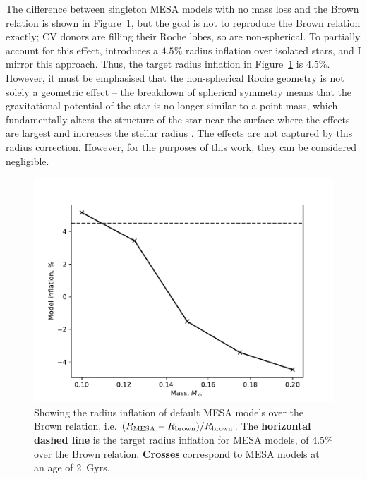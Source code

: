 The difference between singleton MESA models with no mass loss and the Brown relation is shown in Figure~\ref{fig:modelling:MESA inflation over Brown relation}, but the goal is not to reproduce the Brown relation exactly; CV donors are filling their Roche lobes, so are non-spherical.
To partially account for this effect, \citet{knigge11} introduces a $4.5\%$ radius inflation over isolated stars, and I mirror this approach. Thus, the target radius inflation in Figure~\ref{fig:modelling:MESA inflation over Brown relation} is $4.5\%$.
However, it must be emphasised that the non-spherical Roche geometry is not solely a geometric effect -- the breakdown of spherical symmetry means that the gravitational potential of the star is no longer similar to a point mass, which fundamentally alters the structure of the star near the surface where the effects are largest and increases the stellar radius \citep{renvoize2002}. The effects are not captured by this radius correction. However, for the purposes of this work, they can be considered negligible.
\begin{figure}
    \centering
    \includegraphics[width=\textwidth]{figures/modelling/MESA_inflation_over_brown.pdf}
    \caption{Showing the radius inflation of default MESA models over the Brown relation, i.e. $(R_{\rm MESA} - R_{\rm brown}) / R_{\rm brown}$. The {\bf horizontal dashed line} is the target radius inflation for MESA models, of 4.5\% over the Brown relation. {\bf Crosses} correspond to MESA models at an age of 2~Gyrs.}
    \label{fig:modelling:MESA inflation over Brown relation}
\end{figure}

